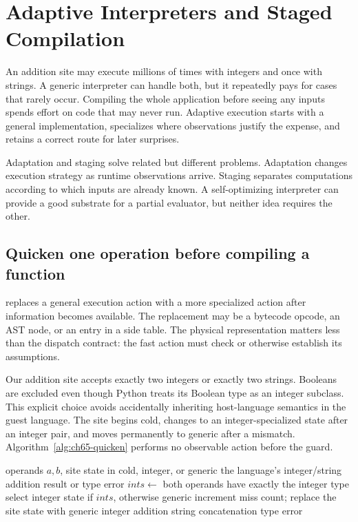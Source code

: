 \chapter{Adaptive Interpreters and Staged Compilation}
\label{ch:adaptive-staged}

An addition site may execute millions of times with integers and once with strings.
A generic interpreter can handle both, but it repeatedly pays for cases that rarely occur.
Compiling the whole application before seeing any inputs spends effort on code that may never run.
Adaptive execution starts with a general implementation, specializes where observations justify the expense, and retains a correct route for later surprises.

Adaptation and staging solve related but different problems.
Adaptation changes execution strategy as runtime observations arrive.
Staging separates computations according to which inputs are already known.
A self-optimizing interpreter can provide a good substrate for a partial evaluator, but neither idea requires the other.

\section{Quicken one operation before compiling a function}
\label{sec:ch65-quickening}

 replaces a general execution action with a more specialized action after information becomes available.
The replacement may be a bytecode opcode, an AST node, or an entry in a side table.
The physical representation matters less than the dispatch contract: the fast action must check or otherwise establish its assumptions.

Our addition site accepts exactly two integers or exactly two strings.
Booleans are excluded even though Python treats its Boolean type as an integer subclass.
This explicit choice avoids accidentally inheriting host-language semantics in the guest language.
The site begins cold, changes to an integer-specialized state after an integer pair, and moves permanently to generic after a mismatch.
Algorithm~\ref{alg:ch65-quicken} performs no observable action before the guard.

\begin{algorithm}[htbp]
\caption{Execute a guarded addition site with one-way generalization.}
\label{alg:ch65-quicken}
\begin{pseudocode}
\Require operands $a,b$, site state in cold, integer, or generic
\Ensure the language's integer/string addition result or type error
\State $ints\gets$ both operands have exactly the integer type
  \State select integer state if $ints$, otherwise generic
\EndIf
{}
  \State increment miss count; replace the site state with generic
\EndIf
{}
  \State \Return integer addition
\EndIf
{}
  \State \Return string concatenation
\EndIf
\State \Return type error
\end{pseudocode}
\end{algorithm}

